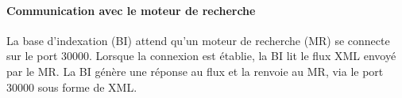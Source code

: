 \paragraph{Communication avec le moteur de recherche}
La base d'indexation (BI) attend qu'un moteur de recherche (MR) se connecte sur le port 30000. Lorsque la connexion est établie,
la BI lit le flux XML envoyé par le MR. La BI génère une réponse au flux et la renvoie au MR, via le port 30000 sous forme de XML.
